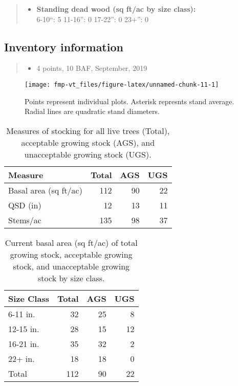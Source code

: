 \documentclass[]{tufte-handout}
\providecommand{\tightlist}{%
  \setlength{\itemsep}{0pt}\setlength{\parskip}{0pt}}
\begin{document}
\begin{quote}
\begin{itemize}
\tightlist
\item
  \textbf{Standing dead wood (sq ft/ac by size class):}\\
  \vspace{2pt} \indent \small 6-10``: 5 \textbar{} 11-16'': 0 \textbar{}
  17-22'': 0 \textbar{} 23+'': 0
\end{itemize}
\end{quote}

\subsection{Inventory information}\label{inventory-information-1}

\begin{quote}
\begin{itemize}
\tightlist
\item
  4 points, 10 BAF, September, 2019
\end{itemize}
\end{quote}

\begin{figure}
\texttt{[image: fmp-vt\_files/figure-latex/unnamed-chunk-11-1]} \caption[Points represent individual plots]{Points represent individual plots. Asterisk represnts stand average. Radial lines are quadratic stand diameters.}\label{fig:unnamed-chunk-11}
\end{figure}

\begin{table}

\caption{\label{tab:unnamed-chunk-12}Measures of stocking for all live trees (Total), acceptable growing stock (AGS), and unacceptable growing stock (UGS).}
\centering
\begin{tabular}[t]{lrrr}
\toprule
Measure & Total & AGS & UGS\\
\midrule
Basal area (sq ft/ac) & 112 & 90 & 22\\
QSD (in) & 12 & 13 & 11\\
Stems/ac & 135 & 98 & 37\\
\bottomrule
\end{tabular}
\end{table}

\begin{table}

\caption{\label{tab:unnamed-chunk-13}Current basal area (sq ft/ac) of total growing stock, acceptable growing stock, and unacceptable growing stock by size class.}
\centering
\begin{tabular}[t]{lrrr}
\toprule
Size Class & Total & AGS & UGS\\
\midrule
6-11 in. & 32 & 25 & 8\\
12-15 in. & 28 & 15 & 12\\
16-21 in. & 35 & 32 & 2\\
22+ in. & 18 & 18 & 0\\
Total & 112 & 90 & 22\\
\bottomrule
\end{tabular}
\end{table}
\end{document}
